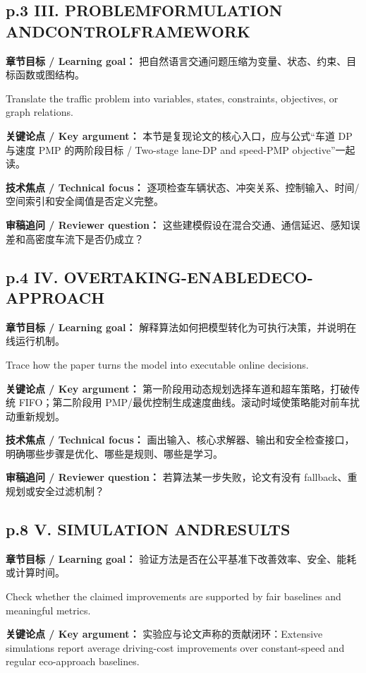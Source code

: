 \documentclass[UTF8,a4paper,11pt,fontset=fandol]{ctexart}
\begin{document}
\subsection*{p.3 III. PROBLEMFORMULATION ANDCONTROLFRAMEWORK}
\textbf{章节目标 / Learning goal：} 把自然语言交通问题压缩为变量、状态、约束、目标函数或图结构。

Translate the traffic problem into variables, states, constraints, objectives, or graph relations.

\textbf{关键论点 / Key argument：} 本节是复现论文的核心入口，应与公式“车道 DP 与速度 PMP 的两阶段目标 / Two-stage lane-DP and speed-PMP objective”一起读。

\textbf{技术焦点 / Technical focus：} 逐项检查车辆状态、冲突关系、控制输入、时间/空间索引和安全阈值是否定义完整。

\textbf{审稿追问 / Reviewer question：} 这些建模假设在混合交通、通信延迟、感知误差和高密度车流下是否仍成立？

\subsection*{p.4 IV. OVERTAKING-ENABLEDECO-APPROACH}
\textbf{章节目标 / Learning goal：} 解释算法如何把模型转化为可执行决策，并说明在线运行机制。

Trace how the paper turns the model into executable online decisions.

\textbf{关键论点 / Key argument：} 第一阶段用动态规划选择车道和超车策略，打破传统 FIFO；第二阶段用 PMP/最优控制生成速度曲线。滚动时域使策略能对前车扰动重新规划。

\textbf{技术焦点 / Technical focus：} 画出输入、核心求解器、输出和安全检查接口，明确哪些步骤是优化、哪些是规则、哪些是学习。

\textbf{审稿追问 / Reviewer question：} 若算法某一步失败，论文有没有 fallback、重规划或安全过滤机制？

\subsection*{p.8 V. SIMULATION ANDRESULTS}
\textbf{章节目标 / Learning goal：} 验证方法是否在公平基准下改善效率、安全、能耗或计算时间。

Check whether the claimed improvements are supported by fair baselines and meaningful metrics.

\textbf{关键论点 / Key argument：} 实验应与论文声称的贡献闭环：Extensive simulations report average driving-cost improvements over constant-speed and regular eco-approach baselines.
\end{document}
